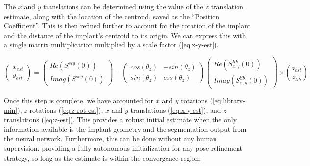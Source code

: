 The $x$ and $y$ translations can be determined using the value of the $z$ translation estimate, along with the location of the centroid, saved as the ``Position Coefficient''. This is then refined further to account for the rotation of the implant and the distance of the implant's centroid to its origin. We can express this with a single matrix multiplication multiplied by a scale factor (\cref{eq:x-y-est}).

\begin{equation}
    \begin{pmatrix}
        x_{est} \\ y_{est}
    \end{pmatrix} = \begin{pmatrix}
        Re(S^{seg}(0)) \\ Imag(S^{seg}(0))
    \end{pmatrix} - \begin{pmatrix}
        cos(\theta_z) & -sin(\theta_z) \\ sin(\theta_z) & cos(\theta_z)
    \end{pmatrix}\begin{pmatrix}
        Re(S^{lib}_{x,y}(0)) \\ Imag(S^{lib}_{x,y}(0))
    \end{pmatrix} \times \left(\frac{z_{est}}{z_{lib}}\right)
    \label{eq:x-y-est}
\end{equation}

Once this step is complete, we have accounted for $x$ and $y$ rotations (\cref{eq:library-min}), $z$ rotations (\cref{eq:z-rot-est}), $x$ and $y$ translations (\cref{eq:x-y-est}), and $z$ translations (\cref{eq:z-est}). This provides a robust initial estimate when the only information available is the implant geometry and the segmentation output from the neural network. Furthermore, this can be done without any human supervision, providing a fully autonomous initialization for any pose refinement strategy, so long as the estimate is within the convergence region.

